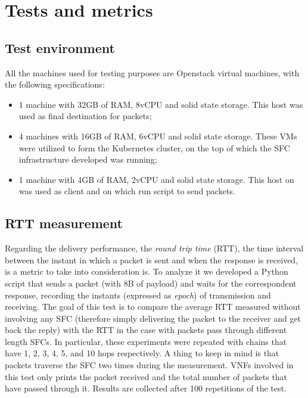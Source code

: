 \chapter{Tests and metrics}
\label{chap:tests}

\section{Test environment}
All the machines used for testing purposes are Openstack virtual machines, with
the following specifications:
\begin{itemize}
\item 1 machine with 32GB of RAM, 8vCPU and solid state storage. This host was
used as final destination for packets;
\item 4 machines with 16GB of RAM, 6vCPU and solid state storage. These VMs
were utilized to form the Kubernetes cluster, on the top of which the SFC
infrastructure developed was running;
\item 1 machine with 4GB of RAM, 2vCPU and solid state storage. This host on
was used as client and on which run script to send packets.
\end{itemize}

\section{RTT measurement}
Regarding the delivery performance, the
\emph{round trip time} (RTT), the time interval between the instant in
which a packet is sent and when the response is received, is a metric to take
into consideration is. To analyze it we developed a Python script that sends a
packet (with 8B of payload) and waits for the correspondent response, recording
the instants (expressed as \emph{epoch}) of transmission and receiving. The goal
of this test is to compare the average RTT measured without involving any SFC 
(therefore simply delivering the packet to the receiver and get back the reply)
with the RTT in the case with packets pass through different length SFCs. In
particular, these experiments were repeated with chains that have 1, 2, 3, 4, 5,
and 10 hops respectively. A thing to keep in mind is that packets traverse the
SFC two times during the measurement. VNFs involved in this test only prints the
packet received and the total number of packets that have passed through it.
Results are collected after 100 repetitions of the test.

